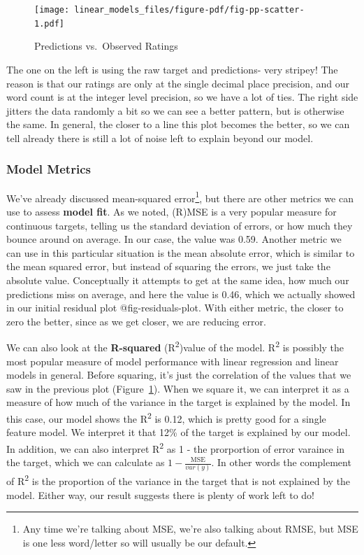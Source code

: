 \documentclass[
  letterpaper,
]{krantz}
\begin{document}
\begin{figure}

{\centering \texttt{[image: linear\_models\_files/figure-pdf/fig-pp-scatter-1.pdf]}

}

\caption{\label{fig-pp-scatter}Predictions vs.~Observed Ratings}

\end{figure}

The one on the left is using the raw target and predictions- very
stripey! The reason is that our ratings are only at the single decimal
place precision, and our word count is at the integer level precision,
so we have a lot of ties. The right side jitters the data randomly a bit
so we can see a better pattern, but is otherwise the same. In general,
the closer to a line this plot becomes the better, so we can tell
already there is still a lot of noise left to explain beyond our model.

\subsubsection{Model Metrics}\label{model-metrics}

We've already discussed mean-squared error\footnote{Any time we're
  talking about MSE, we're also talking about RMSE, but MSE is one less
  word/letter so will usually be our default.}, but there are other
metrics we can use to assess \textbf{model fit}. As we noted, (R)MSE is
a very popular measure for continuous targets, telling us the standard
deviation of errors, or how much they bounce around on average. In our
case, the value was 0.59. Another metric we can use in this particular
situation is the mean absolute error, which is similar to the mean
squared error, but instead of squaring the errors, we just take the
absolute value. Conceptually it attempts to get at the same idea, how
much our predictions miss on average, and here the value is 0.46, which
we actually showed in our initial residual plot @fig-residuals-plot.
With either metric, the closer to zero the better, since as we get
closer, we are reducing error.

We can also look at the \textbf{R-squared} (R\textsuperscript{2})value
of the model. R\textsuperscript{2} is possibly the most popular measure
of model performance with linear regression and linear models in
general. Before squaring, it's just the correlation of the values that
we saw in the previous plot (Figure~\ref{fig-pp-scatter}). When we
square it, we can interpret it as a measure of how much of the variance
in the target is explained by the model. In this case, our model shows
the R\textsuperscript{2} is 0.12, which is pretty good for a single
feature model. We interpret it that 12\% of the target is explained by
our model. In addition, we can also interpret R\textsuperscript{2} as 1
- the prorportion of error varaince in the target, which we can
calculate as \(1 - \frac{\textrm{MSE}}{var(y)}\). In other words the
complement of R\textsuperscript{2} is the proportion of the variance in
the target that is not explained by the model. Either way, our result
suggests there is plenty of work left to do!
\end{document}
